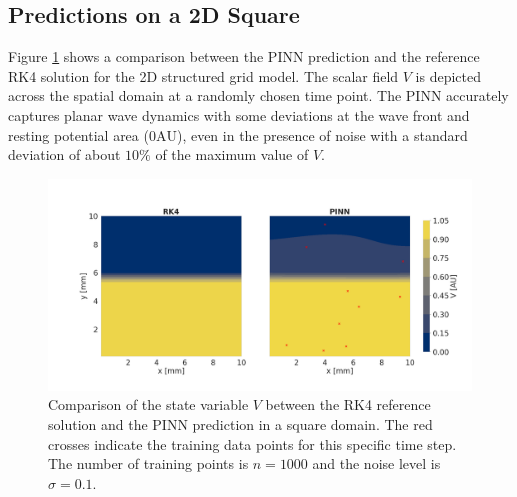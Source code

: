 \subsection{Predictions on a 2D Square}

Figure \ref{fig:2D_prediction} shows a comparison between the PINN prediction and the reference RK4 solution for the 2D structured grid model. The scalar field $V$ is depicted across the spatial domain at a randomly chosen time point. The PINN accurately captures planar wave dynamics with some deviations at the wave front and resting potential area ($0\mathrm{AU}$), even in the presence of noise with a standard deviation of about $10\%$ of the maximum value of $V$. 
\begin{figure}[H]
  \centering
  \includegraphics[width=\textwidth]{Figs/1D/2D_1000_0.1.png}
  \caption{Comparison of the state variable \( V \) between the RK4 reference solution and the PINN prediction in a square domain. The red crosses indicate the training data points for this specific time step. The number of training points is \( n = 1000 \) and the noise level is \( \sigma = 0.1 \).}
  \label{fig:2D_prediction}
\end{figure}

